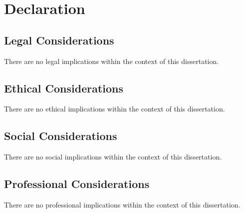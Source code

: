 
\chapter{Declaration}
\label{app:declaration}

\section{Legal Considerations}
\label{app:declaration:legal}

There are no legal implications within the context of this dissertation.
\par

\section{Ethical Considerations}
\label{app:declaration:ethical}

There are no ethical implications within the context of this dissertation.
\par

\section{Social Considerations}
\label{app:declaration:social}

There are no social implications within the context of this dissertation.
\par

\section{Professional Considerations}
\label{app:declaration:professional}

There are no professional implications within the context of this dissertation.
\par

